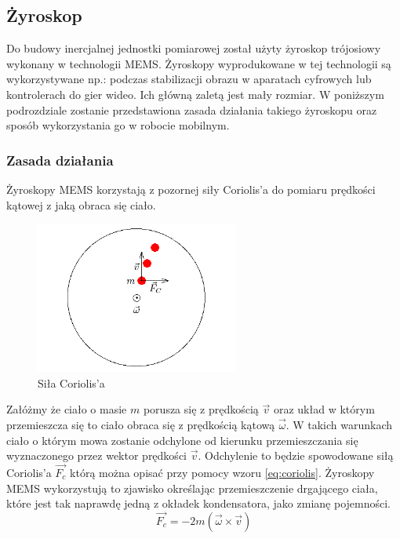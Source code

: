 \subsection{Żyroskop}
Do budowy inercjalnej jednostki pomiarowej został użyty żyroskop trójosiowy wykonany w technologii MEMS. Żyroskopy wyprodukowane w tej technologii są wykorzystywane np.: podczas stabilizacji obrazu w aparatach cyfrowych lub kontrolerach do gier wideo. Ich główną zaletą jest mały rozmiar. W poniższym podrozdziale zostanie  przedstawiona zasada działania takiego żyroskopu oraz sposób wykorzystania go w robocie mobilnym.

\subsubsection{Zasada działania}
Żyroskopy MEMS korzystają z pozornej siły Coriolis'a do pomiaru prędkości kątowej z jaką obraca się ciało.
\begin{figure}[!ht]
 \centering
 \includegraphics[height=50mm]{../images/ch04/coriolis.png}
 \caption{Siła Coriolis'a}
 \label{fig:Coriolis}
\end{figure}
Załóżmy że ciało o masie $m$ porusza się z prędkością $\vec{v}$ oraz układ w którym przemieszcza się to ciało obraca się z prędkością kątową $\vec{\omega}$. W takich warunkach ciało o którym mowa zostanie odchylone od kierunku przemieszczania się wyznaczonego przez wektor prędkości $\vec{v}$. Odchylenie to będzie spowodowane siłą Coriolis'a $\vec{F_{c}}$ którą można opisać przy pomocy wzoru \ref{eq:coriolis}. Żyroskopy MEMS wykorzystują to zjawisko określając przemieszczenie drgającego ciała, które jest tak naprawdę jedną z okładek kondensatora, jako zmianę pojemności.
\begin{equation}
  \label{eq:coriolis}
  \vec{F_{c}} = -2m \left(\vec{\omega}\times\vec{v}\right)
\end{equation}
